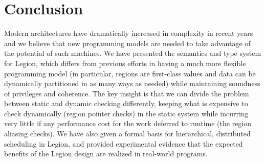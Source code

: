 
\section{Conclusion}
\label{sect:conclusion}

Modern architectures have dramatically increased in complexity in recent years and we believe that new programming models
are needed to take advantage of the potential of such machines.  We have presented the semantics and type system
for Legion, which differs from previous efforts in having a much more flexible programming model (in particular,
regions are first-class values and data can be dynamically partitioned in as many ways as needed) while maintaining
soundness of privileges and coherence.  The key insight is that we can divide the problem between static and dynamic
checking differently, keeping what is expensive to check dynamically (region pointer checks) in the static system while incurring very little if any performance cost for the work deferred to runtime (the region aliasing checks).  We have also given
a formal basis for hierarchical, distributed scheduling in Legion, and provided experimental evidence  that the
expected benefits of the Legion design are realized in real-world programs.

